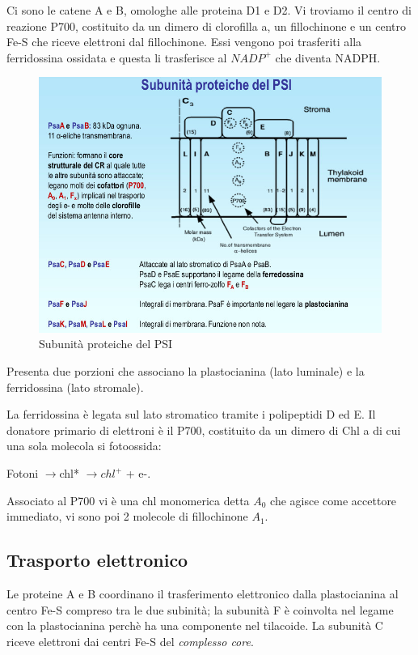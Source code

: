 \documentclass[a4paper,12pt]{book}
\newcommand{\lfreccia}{\ensuremath{\longrightarrow}}
\begin{document}
Ci sono le catene A e B, omologhe alle proteina D1 e D2. Vi troviamo il centro di reazione P700, costituito da un dimero di clorofilla a, un fillochinone e un centro Fe-S che riceve elettroni dal fillochinone. Essi vengono poi trasferiti alla ferridossina ossidata e questa li trasferisce al $NADP^{+}$ che diventa NADPH.
\begin{figure}[H]
\centering
\includegraphics[scale=0.4]{immagini/proteine.jpg}
\caption{Subunità proteiche del PSI}
\end{figure}
Presenta due porzioni che associano la plastocianina (lato luminale) e la ferridossina (lato stromale).

La ferridossina è legata sul lato stromatico tramite i polipeptidi D ed E.
Il donatore primario di elettroni è il P700, costituito da un
dimero di Chl a di cui una sola molecola si fotoossida:

Fotoni \lfreccia chl* \lfreccia $chl^{+}$ + e-.

Associato al P700 vi è una chl monomerica detta $A_{0}$
che agisce come accettore immediato, vi sono poi 2
molecole di fillochinone $A_{1}$.

\subsection{Trasporto elettronico}
Le proteine A e B coordinano il trasferimento elettronico dalla plastocianina al centro Fe-S compreso tra le due subinità; la subunità F è coinvolta nel legame con la plastocianina perchè ha una componente nel tilacoide.
La subunità C riceve elettroni dai centri Fe-S del \emph{complesso core}. 
\end{document}
